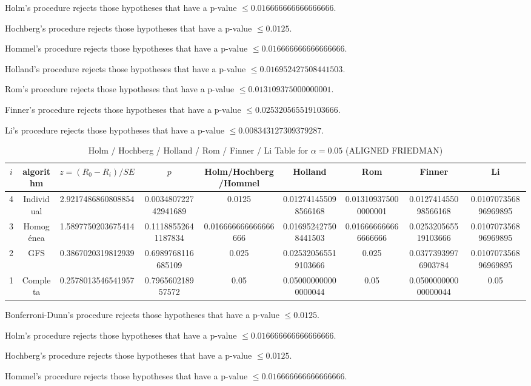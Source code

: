 \documentclass[a4paper,10pt]{article}
\begin{document}
\begin{landscape}
Holm's procedure rejects those hypotheses that have a p-value $\le0.016666666666666666$.


Hochberg's procedure rejects those hypotheses that have a p-value $\le0.0125$.


Hommel's procedure rejects those hypotheses that have a p-value $\le0.016666666666666666$.


Holland's procedure rejects those hypotheses that have a p-value $\le0.016952427508441503$.


Rom's procedure rejects those hypotheses that have a p-value $\le0.013109375000000001$.


Finner's procedure rejects those hypotheses that have a p-value $\le0.025320565519103666$.


Li's procedure rejects those hypotheses that have a p-value $\le0.008343127309379287$.



\newpage

\begin{table}[!htp]
\centering\scriptsize
\caption{Holm / Hochberg / Holland / Rom / Finner / Li Table for $\alpha=0.05$ (ALIGNED FRIEDMAN)}
\begin{tabular}{ccccccccc}
$i$&algorithm&$z=(R_0 - R_i)/SE$&$p$&Holm/Hochberg/Hommel&Holland&Rom&Finner&Li\\
\hline
4&Individual&2.9217486860808854&0.003480722742941689&0.0125&0.012741455098566168&0.013109375000000001&0.012741455098566168&0.010707356896969895\\
3&Homogénea&1.5897750203675414&0.11188552641187834&0.016666666666666666&0.016952427508441503&0.016666666666666666&0.025320565519103666&0.010707356896969895\\
2&GFS&0.3867020319812939&0.6989768116685109&0.025&0.025320565519103666&0.025&0.03773939976903784&0.010707356896969895\\
1&Completa&0.2578013546541957&0.796560218957572&0.05&0.050000000000000044&0.05&0.050000000000000044&0.05\\
\hline
\end{tabular}
\end{table}
Bonferroni-Dunn's procedure rejects those hypotheses that have a p-value $\le0.0125$.


Holm's procedure rejects those hypotheses that have a p-value $\le0.016666666666666666$.


Hochberg's procedure rejects those hypotheses that have a p-value $\le0.0125$.


Hommel's procedure rejects those hypotheses that have a p-value $\le0.016666666666666666$.



\end{landscape}
\end{document}
